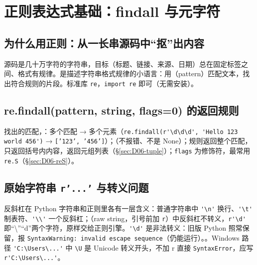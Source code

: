 \section{正则表达式基础：findall 与元字符}

\subsection{为什么用正则：从一长串源码中“抠”出内容}
源码是几十万字符的字符串，目标（标题、链接、来源、日期）总在固定标签之间、格式有规律。是描述字符串格式规律的小语言：用（pattern）匹配文本，找出符合规则的片段。标准库 \texttt{re}，\texttt{import re} 即可（无需安装）。

\subsection{re.findall(pattern, string, flags=0) 的返回规则}
找出的匹配，：多个匹配 → 多个元素（\lstinline|re.findall(r'\d\d\d', 'Hello 123 world 456')| → \texttt{['123', '456']}）；（不报错、不是 None）；规则返回整个匹配，只返回括号内内容，返回元组列表（§\ref{sec:D06-tuple}）；\texttt{flags} 为修饰符，最常用 \texttt{re.S}（§\ref{sec:D06-reS}）。

\subsection{\texorpdfstring{原始字符串 \texttt{r'...'} 与转义问题}{原始字符串 r'...' 与转义问题}}
反斜杠在 Python 字符串和正则里各有一层含义：普通字符串中 \lstinline|'\n'| 换行、\lstinline|'\t'| 制表符、\lstinline|'\\'| 一个反斜杠；（raw string，引号前加 \texttt{r}）中反斜杠不转义，\lstinline|r'\d'| 即“\textbackslash”“d”两个字符，原样交给正则引擎。\lstinline|'\d'| 是非法转义：旧版 Python 照常保留，报 \texttt{SyntaxWarning: invalid escape sequence}（仍能运行）。。Windows 路径 \lstinline|'C:\Users\...'| 中 \lstinline|\U| 是 Unicode 转义开头，不加 r 直接 \texttt{SyntaxError}，应写 \lstinline|r'C:\Users\...'|。

